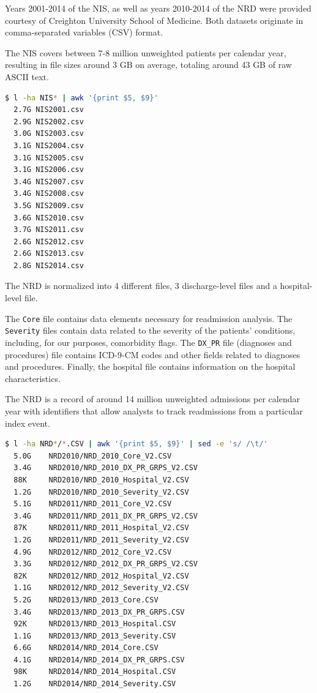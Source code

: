 \documentclass[12pt]{ociamthesis}\usepackage[]{graphicx}\usepackage[]{color}
\begin{document}
Years 2001-2014 of the NIS, as well as years 2010-2014 of the NRD were provided courtesy of Creighton University
School of Medicine. Both datasets originate in comma-separated variables (CSV) format. 

The NIS covers between 7-8 million unweighted patients per calendar year, resulting in file sizes around 3 GB on average,
totaling around 43 GB of raw ASCII text.

\begin{lstlisting}[language=Bash]
  $ l -ha NIS* | awk '{print $5, $9}'
  2.7G NIS2001.csv                                                          
  2.9G NIS2002.csv                                                          
  3.0G NIS2003.csv                                                          
  3.1G NIS2004.csv                                                          
  3.1G NIS2005.csv                                                          
  3.1G NIS2006.csv                                                          
  3.4G NIS2007.csv                                                          
  3.4G NIS2008.csv                                                          
  3.5G NIS2009.csv
  3.6G NIS2010.csv
  3.7G NIS2011.csv
  2.6G NIS2012.csv
  2.6G NIS2013.csv
  2.8G NIS2014.csv
\end{lstlisting}

The NRD is normalized into 4 different files, 3 discharge-level files and a hospital-level file.

The \texttt{Core} file contains data elements necessary for readmission analysis. The \texttt{Severity} files
contain data related to the severity of the patients' conditions, including, for our purposes, comorbidity flags.
The \texttt{DX\_PR} file (diagnoses and procedures) file contains ICD-9-CM codes and other fields related to
diagnoses and procedures. Finally, the hospital file contains information on the hospital characteristics.

The NRD is a record of around 14 million unweighted admissions per calendar year with identifiers that allow analysts 
to track readmissions from a particular index event.

\begin{lstlisting}[language=Bash]
  $ l -ha NRD*/*.CSV | awk '{print $5, $9}' | sed -e 's/ /\t/'
  5.0G    NRD2010/NRD_2010_Core_V2.CSV
  3.4G    NRD2010/NRD_2010_DX_PR_GRPS_V2.CSV
  88K     NRD2010/NRD_2010_Hospital_V2.CSV
  1.2G    NRD2010/NRD_2010_Severity_V2.CSV
  5.1G    NRD2011/NRD_2011_Core_V2.CSV
  3.4G    NRD2011/NRD_2011_DX_PR_GRPS_V2.CSV
  87K     NRD2011/NRD_2011_Hospital_V2.CSV
  1.2G    NRD2011/NRD_2011_Severity_V2.CSV
  4.9G    NRD2012/NRD_2012_Core_V2.CSV
  3.3G    NRD2012/NRD_2012_DX_PR_GRPS_V2.CSV
  82K     NRD2012/NRD_2012_Hospital_V2.CSV
  1.1G    NRD2012/NRD_2012_Severity_V2.CSV
  5.2G    NRD2013/NRD_2013_Core.CSV
  3.4G    NRD2013/NRD_2013_DX_PR_GRPS.CSV
  92K     NRD2013/NRD_2013_Hospital.CSV
  1.1G    NRD2013/NRD_2013_Severity.CSV
  6.6G    NRD2014/NRD_2014_Core.CSV
  4.1G    NRD2014/NRD_2014_DX_PR_GRPS.CSV
  98K     NRD2014/NRD_2014_Hospital.CSV
  1.2G    NRD2014/NRD_2014_Severity.CSV
\end{lstlisting}
\end{document}
